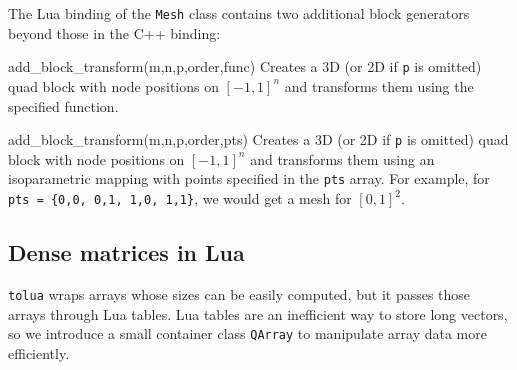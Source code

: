 \documentclass{article}
\newenvironment{codelist}[1][\quad]%
  {\begin{list}{}{%
   \settowidth{\labelwidth}{\texttt{#1}\hfil}%
   \setlength{\leftmargin}{\labelwidth}%
   \addtolength{\leftmargin}{\labelsep}%
   \addtolength{\leftmargin}{\parindent}%
   \renewcommand{\makelabel}[1]{\texttt{##1}}}}%
  {\end{list}}
\newcommand{\ttt}[1]{\texttt{#1}}
\begin{document}
The Lua binding of the \ttt{Mesh} class contains two additional block
generators beyond those in the C++ binding:
\begin{codelist}

  \item[add\_block\_transform(m,n,p,order,func)] 
    Creates a 3D (or 2D if \ttt{p} is omitted) quad block with node
    positions on $[-1,1]^n$ and transforms them using the specified
    function.

  \item[add\_block\_transform(m,n,p,order,pts)] 
    Creates a 3D (or 2D if \ttt{p} is omitted) quad block with node
    positions on $[-1,1]^n$ and transforms them using an isoparametric
    mapping with points specified in the \ttt{pts} array.  For
    example, for \ttt{pts = \{0,0, 0,1, 1,0, 1,1\}}, we would get a
    mesh for $[0,1]^2$.
    
\end{codelist}


\subsection{Dense matrices in Lua}

\ttt{tolua} wraps arrays whose sizes can be easily computed, but it
passes those arrays through Lua tables.  Lua tables are an inefficient
way to store long vectors, so we introduce a small container class
\ttt{QArray} to manipulate array data more efficiently.
\end{document}
